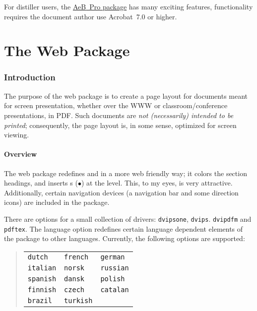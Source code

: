 \documentclass{article}
\def\AEB{\textsf{AeB}}
\let\pkg\textsf
\def\AEB{\textsf{AeB}}
\begin{document}
{\newtopic For distiller users, the
\href{http://www.math.uakron.edu/~dpstory/aeb_pro.html}{\AEB\ Pro package}
has many exciting features, functionality requires the document author use
Acrobat~7.0 or higher.



\part{The Web Package}\label{s:web}

\section{Introduction}

The purpose of the \pkg{web} package is to create a page layout
for documents meant for screen presentation, whether over the
\textsf{WWW} or classroom/conference presentations, in
\textsf{PDF}. Such documents are \emph{not \emph{(necessarily)}
intended to be printed}; consequently, the page layout is, in some
sense, optimized for screen viewing.

\subsection{Overview}

The \pkg{web} package redefines  and
 in a more web friendly way; it colors the
section headings, and inserts s ($\bullet$) at the
 level.  This, to my eyes, is very attractive.
Additionally, certain navigation devices (a navigation bar and
some direction icons) are included in the package.

There are options for a small collection of drivers:
\texttt{dvipsone}, \texttt{dvips}. \texttt{dvipdfm} and \texttt{pdftex}.  The language
option redefines certain language dependent elements of the package
to other languages. Currently, the following options are supported:
\begin{quote}
\begin{tabular}{lll}
\texttt{dutch}   & \texttt{french} & \texttt{german}\\
\texttt{italian} & \texttt{norsk}  & \texttt{russian}\\
\texttt{spanish} & \texttt{dansk}  & \texttt{polish}\\
\texttt{finnish} & \texttt{czech}  & \texttt{catalan}\\
\texttt{brazil}  & \texttt{turkish}
\end{tabular}
\end{quote}

}
\end{document}
